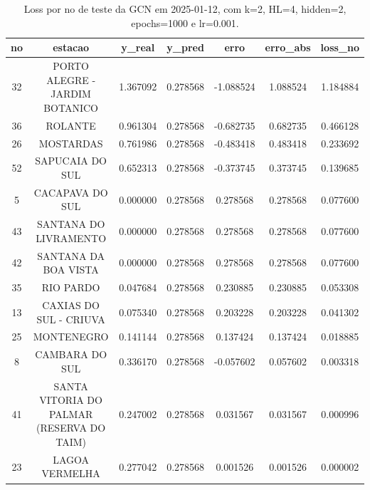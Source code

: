 \begin{table}[h]
\centering
\caption{Loss por no de teste da GCN em 2025-01-12, com k=2, HL=4, hidden=2, epochs=1000 e lr=0.001.}
\label{tab:gcn_loss_k2_hl4_h2_e1000_d20250112}
\begin{tabular}{ccccccc}
\toprule
no & estacao & y\_real & y\_pred & erro & erro\_abs & loss\_no \\
\midrule
32 & PORTO ALEGRE - JARDIM BOTANICO & 1.367092 & 0.278568 & -1.088524 & 1.088524 & 1.184884 \\
36 & ROLANTE & 0.961304 & 0.278568 & -0.682735 & 0.682735 & 0.466128 \\
26 & MOSTARDAS & 0.761986 & 0.278568 & -0.483418 & 0.483418 & 0.233692 \\
52 & SAPUCAIA DO SUL & 0.652313 & 0.278568 & -0.373745 & 0.373745 & 0.139685 \\
5 & CACAPAVA DO SUL & 0.000000 & 0.278568 & 0.278568 & 0.278568 & 0.077600 \\
43 & SANTANA DO LIVRAMENTO & 0.000000 & 0.278568 & 0.278568 & 0.278568 & 0.077600 \\
42 & SANTANA DA BOA VISTA & 0.000000 & 0.278568 & 0.278568 & 0.278568 & 0.077600 \\
35 & RIO PARDO & 0.047684 & 0.278568 & 0.230885 & 0.230885 & 0.053308 \\
13 & CAXIAS DO SUL - CRIUVA & 0.075340 & 0.278568 & 0.203228 & 0.203228 & 0.041302 \\
25 & MONTENEGRO & 0.141144 & 0.278568 & 0.137424 & 0.137424 & 0.018885 \\
8 & CAMBARA DO SUL & 0.336170 & 0.278568 & -0.057602 & 0.057602 & 0.003318 \\
41 & SANTA VITORIA DO PALMAR (RESERVA DO TAIM) & 0.247002 & 0.278568 & 0.031567 & 0.031567 & 0.000996 \\
23 & LAGOA VERMELHA & 0.277042 & 0.278568 & 0.001526 & 0.001526 & 0.000002 \\
\bottomrule
\end{tabular}
\end{table}
